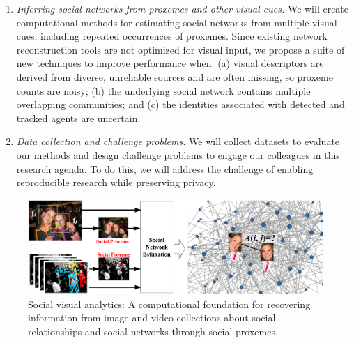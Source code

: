 \begin{enumerate}
\vspace{-0.1in}\item \emph{Inferring social networks from proxemes and other visual cues.} We will create computational methods for estimating social networks from multiple visual cues, including repeated occurrences of proxemes. Since existing network reconstruction tools are not optimized for visual input, we propose a suite of new techniques to improve performance when: (a) visual descriptors are derived from diverse, unreliable sources and are often missing, so proxeme counts are noisy; (b) the underlying social network contains multiple overlapping communities; and (c) the identities associated with detected and tracked agents are uncertain. 


\vspace{-0.1in}\item \emph{Data collection and challenge problems.} We will collect datasets to evaluate our methods and design challenge problems to engage our colleagues in this research agenda. To do this, we will address the challenge of enabling reproducible research while preserving privacy.

\end{enumerate}

\begin{figure}[t!]
\begin{center}
\includegraphics[width=\columnwidth]{intro_2014}
\end{center}
\vspace{-0.25in} \caption{\captionsize 
Social visual analytics: A computational foundation for recovering information from image and video collections about social relationships and social networks through social proxemes. \label{fig:intro}\afterfigspace}
\end{figure}




